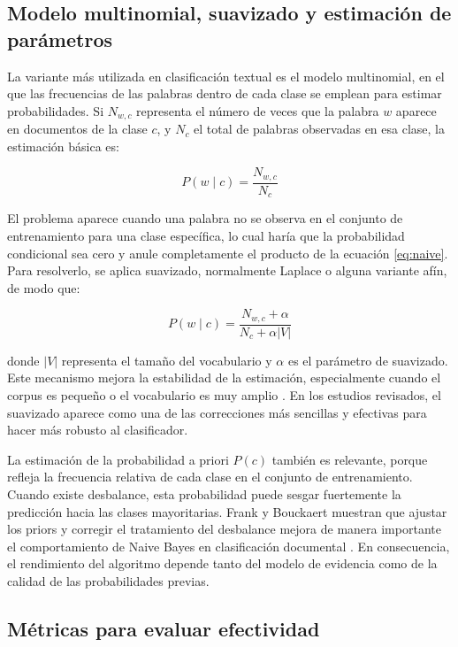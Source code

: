 \subsection{Modelo multinomial, suavizado y estimación de parámetros}

La variante más utilizada en clasificación textual es el modelo multinomial, en el que las frecuencias de las palabras dentro de cada clase se emplean para estimar probabilidades. Si $N_{w,c}$ representa el número de veces que la palabra $w$ aparece en documentos de la clase $c$, y $N_c$ el total de palabras observadas en esa clase, la estimación básica es:

\begin{equation}
P(w \mid c) = \frac{N_{w,c}}{N_c}
\label{eq:mnb_basic}
\end{equation}

El problema aparece cuando una palabra no se observa en el conjunto de entrenamiento para una clase específica, lo cual haría que la probabilidad condicional sea cero y anule completamente el producto de la ecuación \eqref{eq:naive}. Para resolverlo, se aplica suavizado, normalmente Laplace o alguna variante afín, de modo que:

\begin{equation}
P(w \mid c) = \frac{N_{w,c} + \alpha}{N_c + \alpha |V|}
\label{eq:smoothing}
\end{equation}

donde $|V|$ representa el tamaño del vocabulario y $\alpha$ es el parámetro de suavizado. Este mecanismo mejora la estabilidad de la estimación, especialmente cuando el corpus es pequeño o el vocabulario es muy amplio \cite{10.1007/978-3-540-71496-5_73}. En los estudios revisados, el suavizado aparece como una de las correcciones más sencillas y efectivas para hacer más robusto al clasificador.

La estimación de la probabilidad a priori $P(c)$ también es relevante, porque refleja la frecuencia relativa de cada clase en el conjunto de entrenamiento. Cuando existe desbalance, esta probabilidad puede sesgar fuertemente la predicción hacia las clases mayoritarias. Frank y Bouckaert muestran que ajustar los priors y corregir el tratamiento del desbalance mejora de manera importante el comportamiento de Naive Bayes en clasificación documental \cite{Frank2006}. En consecuencia, el rendimiento del algoritmo depende tanto del modelo de evidencia como de la calidad de las probabilidades previas.

\subsection{Métricas para evaluar efectividad}

